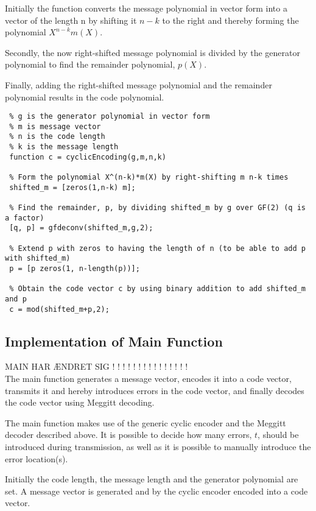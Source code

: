\documentclass[Main]{subfiles}
\begin{document}
\noindent Initially the function converts the message polynomial in vector form into a vector of the length n by shifting it $n-k$ to the right and thereby forming the polynomial $X^{n-k}m(X)$. 

\noindent Secondly, the now right-shifted message polynomial is divided by the generator polynomial to find the remainder polynomial, $p(X)$.

\noindent Finally, adding the right-shifted message polynomial and the remainder polynomial results in the code polynomial.  

\begin{lstlisting}[caption=Cyclic Encoder, style=Code-Matlab, label=lst:refID]
 % cyclicEncoding is a function that encodes a message vector into systematic code given the following parameters
 % g is the generator polynomial in vector form
 % m is message vector
 % n is the code length
 % k is the message length
 function c = cyclicEncoding(g,m,n,k)

 % Form the polynomial X^(n-k)*m(X) by right-shifting m n-k times 
 shifted_m = [zeros(1,n-k) m];

 % Find the remainder, p, by dividing shifted_m by g over GF(2) (q is a factor)
 [q, p] = gfdeconv(shifted_m,g,2);

 % Extend p with zeros to having the length of n (to be able to add p with shifted_m)
 p = [p zeros(1, n-length(p))];

 % Obtain the code vector c by using binary addition to add shifted_m and p 
 c = mod(shifted_m+p,2);
\end{lstlisting}

\subsection{Implementation of Main Function}
MAIN HAR ÆNDRET SIG ! ! ! ! ! ! ! ! ! ! ! ! ! ! ! \\
The main function generates a message vector, encodes it into a code vector, transmits it and hereby introduces errors in the code vector, and finally decodes the code vector using Meggitt decoding.

\noindent The main function makes use of the generic cyclic encoder and the Meggitt decoder described above. It is possible to decide how many errors, $t$, should be introduced during transmission, as well as it is possible to manually introduce the error location(s).

\noindent Initially the code length, the message length and the generator polynomial are set. A message vector is generated and by the cyclic encoder encoded into a code vector. 
\end{document}
